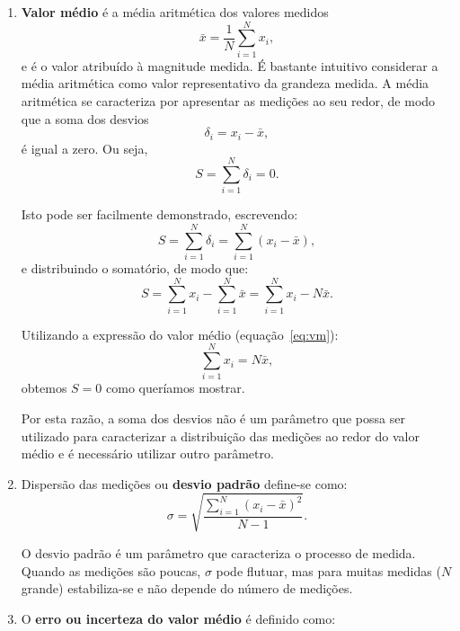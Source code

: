 \begin{enumerate}
\item {\bf Valor m\'edio} \'e  a m\'edia aritm\'etica dos valores medidos
\begin{equation}
\bar{x} = \frac{1}{N} \sum_{i = 1}^N {x_i},
\label{eq:vm}
\end{equation}
\noindent
e é o valor atribu\'ido \`a magnitude medida. É bastante intuitivo considerar a m\'edia aritm\'etica como valor representativo da grandeza medida. A m\'edia aritm\'etica se caracteriza por apresentar as medições ao seu redor, de modo que a soma dos desvios 
\begin{equation}
\delta_i = x_i - \bar{x} ,
\end{equation}
\noindent
é igual a zero. Ou seja,
\begin{equation}
S = \sum_{i=1}^N \delta_i = 0.
\end{equation}

Isto pode ser facilmente demonstrado, escrevendo:
\begin{equation}
S = \sum_{i=1}^N \delta_i =  \sum_{i=1}^N (x_i - \bar{x}),
\end{equation}
\noindent
e distribuindo o somatório, de modo que:
\begin{equation}
S = \sum_{i=1}^N x_i - \sum_{i=1}^N \bar{x}  =  \sum_{i=1}^N x_i - N\bar{x}.
\end{equation}

Utilizando a expressão do valor médio (equação~\ref{eq:vm}):
\begin{equation}
\sum_{i=1}^N x_i = N\bar{x},
\end{equation}
\noindent
obtemos $S = 0$ como queríamos mostrar.

Por esta razão, a soma dos desvios não é um parâmetro que possa ser utilizado para caracterizar a distribuição das medições ao redor do valor médio e é necessário utilizar outro parâmetro.

\item Dispersão das medições ou {\bf desvio padrão} define-se como:
\begin{equation}
\sigma = \sqrt{\frac{\sum_{i=1}^N (x_i - \bar{x})^2}{N-1}}.
\end{equation}
\noindent

O desvio padrão é um parâmetro que caracteriza o processo de medida. Quando as medições são poucas, $\sigma$ pode flutuar, mas para muitas medidas ($N$ grande) estabiliza-se e não depende do número de medições.

\item O {\bf erro ou incerteza do valor médio} é definido como:


\end{enumerate}
